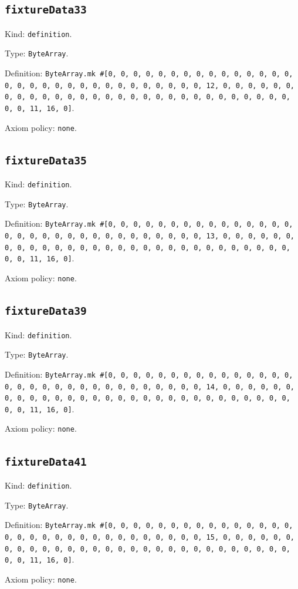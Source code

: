 \documentclass[11pt]{article}
\begin{document}
\subsection*{\texttt{fixtureData33}}
\noindent Kind: \texttt{definition}.\par
\noindent Type: \texttt{ByteArray}.\par
\noindent Definition: \texttt{ByteArray.mk \#[0, 0, 0, 0, 0, 0, 0, 0, 0, 0, 0, 0, 0, 0, 0, 0, 0, 0, 0, 0, 0, 0, 0, 0, 0, 0, 0, 0, 0, 0, 0, 12, 0, 0, 0, 0, 0, 0, 0, 0, 0, 0, 0, 0, 0, 0, 0, 0, 0, 0, 0, 0, 0, 0, 0, 0, 0, 0, 0, 0, 0, 0, 0, 11, 16, 0]}.\par
\noindent Axiom policy: \texttt{none}.\par
\subsection*{\texttt{fixtureData35}}
\noindent Kind: \texttt{definition}.\par
\noindent Type: \texttt{ByteArray}.\par
\noindent Definition: \texttt{ByteArray.mk \#[0, 0, 0, 0, 0, 0, 0, 0, 0, 0, 0, 0, 0, 0, 0, 0, 0, 0, 0, 0, 0, 0, 0, 0, 0, 0, 0, 0, 0, 0, 0, 13, 0, 0, 0, 0, 0, 0, 0, 0, 0, 0, 0, 0, 0, 0, 0, 0, 0, 0, 0, 0, 0, 0, 0, 0, 0, 0, 0, 0, 0, 0, 0, 11, 16, 0]}.\par
\noindent Axiom policy: \texttt{none}.\par
\subsection*{\texttt{fixtureData39}}
\noindent Kind: \texttt{definition}.\par
\noindent Type: \texttt{ByteArray}.\par
\noindent Definition: \texttt{ByteArray.mk \#[0, 0, 0, 0, 0, 0, 0, 0, 0, 0, 0, 0, 0, 0, 0, 0, 0, 0, 0, 0, 0, 0, 0, 0, 0, 0, 0, 0, 0, 0, 0, 14, 0, 0, 0, 0, 0, 0, 0, 0, 0, 0, 0, 0, 0, 0, 0, 0, 0, 0, 0, 0, 0, 0, 0, 0, 0, 0, 0, 0, 0, 0, 0, 11, 16, 0]}.\par
\noindent Axiom policy: \texttt{none}.\par
\subsection*{\texttt{fixtureData41}}
\noindent Kind: \texttt{definition}.\par
\noindent Type: \texttt{ByteArray}.\par
\noindent Definition: \texttt{ByteArray.mk \#[0, 0, 0, 0, 0, 0, 0, 0, 0, 0, 0, 0, 0, 0, 0, 0, 0, 0, 0, 0, 0, 0, 0, 0, 0, 0, 0, 0, 0, 0, 0, 15, 0, 0, 0, 0, 0, 0, 0, 0, 0, 0, 0, 0, 0, 0, 0, 0, 0, 0, 0, 0, 0, 0, 0, 0, 0, 0, 0, 0, 0, 0, 0, 11, 16, 0]}.\par
\noindent Axiom policy: \texttt{none}.\par
\end{document}
